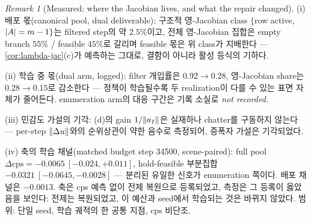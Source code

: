 \documentclass[11pt]{article}
\theoremstyle{plain}
\theoremstyle{definition}
\theoremstyle{remark}
\newtheorem{remark}[theorem]{Remark}
\DeclarePairedDelimiter{\norm}{\lVert}{\rVert}
\DeclarePairedDelimiter{\abs}{\lvert}{\rvert}
\begin{document}
\begin{remark}[Measured: where the Jacobian lives, and what the repair changed]\label{rem:lambda-measured}
(i) 배포 몫(canonical pool, dual deliverable): 구조적 영-Jacobian class
$\{$row active, $\abs A=m-1\}$는 filtered step의 약 $2.5\%$이고, 전체 영-Jacobian 집합은
empty branch $55\%$ / feasible $45\%$로 갈리며 feasible 몫은 위 class가 지배한다 ---
\cref{cor:lambda-jac}(c)가 예측하는 그대로, 결함이 아니라 활성 등식의 기하다.

(ii) 학습 중 몫(dual arm, logged): filter 개입률은 $0.92\to0.28$, 영-Jacobian share는
$0.28\to0.15$로 감소한다 --- 정책이 학습될수록 두 realization이 다를 수 있는 표면 자체가
줄어든다. enumeration arm의 대응 구간은 기록 소실로 \emph{not recorded}.

(iii) 민감도 가설의 기각: (d)의 gain $1/\norm{a_I}$은 실재하나 chatter를 구동하지 않는다
--- per-step $\norm{\Delta u}$와의 순위상관이 약한 음수로 측정되어, 증폭자 가설은 기각되었다.

(iv) 축의 학습 채널(matched budget step 34500, scene-paired): full pool
$\Delta\mathrm{cps}=-0.0065\ [-0.024,+0.011]$, hold-feasible 부분집합
$-0.0321\ [-0.0645,-0.0028]$ --- 분리된 유일한 신호가 enumeration 쪽이다. 배포 채널은
$-0.0013$. 축은 cps 예측 없이 전제 복원으로 등록되었고, 측정은 그 등록이 옳았음을 보인다:
전제는 복원되었고, 이 예산과 seed에서 학습되는 것은 바뀌지 않았다. 범위: 단일 seed, 학습
궤적의 한 공통 지점, cps 비단조.
\end{remark}
\end{document}
